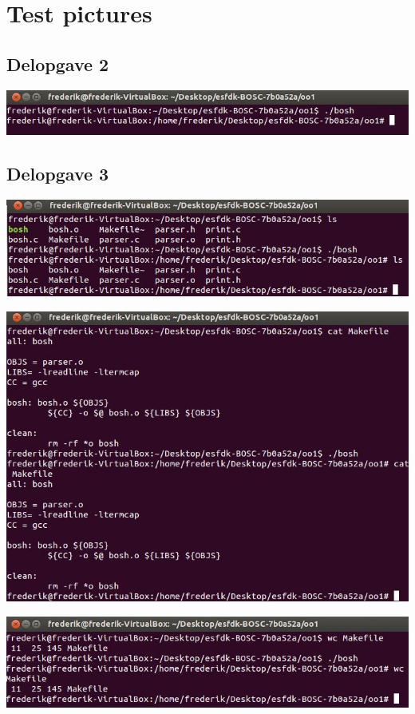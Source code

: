 \chapter{Test pictures}
\section{Delopgave 2}
\includegraphics{Images/TestOfPart2}
\label{Test2}

\section{Delopgave 3}
\includegraphics{Images/TestOfPart3_1}
\label{Test3_1}

\includegraphics{Images/TestOfPart3_2}
\label{Test3_2}

\includegraphics{Images/TestOfPart3_3}
\label{Test3_3}

